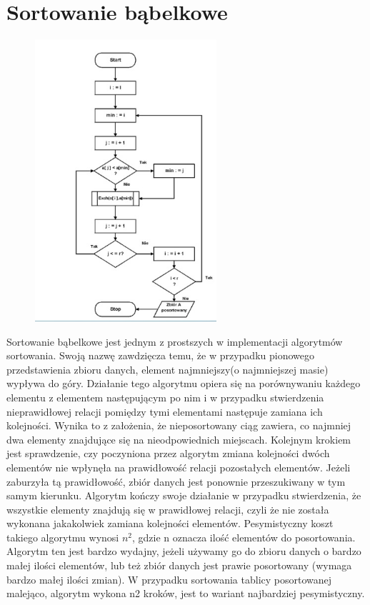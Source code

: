 \documentclass[a4paper,11pt]{article}
\begin{document}
\section{Sortowanie bąbelkowe}
\begin{figure}
\begin{center}
\vspace{-20pt}
\includegraphics[width=0.6\textwidth]{rys10}
\end{center}
\vspace{-20pt}
\vspace{-10pt}
\end{figure}
Sortowanie bąbelkowe jest jednym z prostszych w 
implementacji algorytmów sortowania. Swoją nazwę 
zawdzięcza temu, że w przypadku pionowego przedstawienia 
zbioru danych, element najmniejszy(o najmniejszej masie) 
wypływa do góry. Działanie tego algorytmu opiera się na 
porównywaniu każdego elementu z elementem 
następującym po nim i w przypadku stwierdzenia 
nieprawidłowej relacji pomiędzy tymi elementami następuje 
zamiana ich kolejności. 
Wynika to z założenia, że nieposortowany ciąg zawiera, co 
najmniej dwa elementy znajdujące się na nieodpowiednich 
miejscach. Kolejnym krokiem jest sprawdzenie, czy 
poczyniona przez algorytm zmiana kolejności dwóch 
elementów nie wpłynęła na prawidłowość relacji pozostałych 
elementów. Jeżeli zaburzyła tą prawidłowość, zbiór danych 
jest ponownie przeszukiwany w tym samym kierunku. 
Algorytm kończy swoje działanie w przypadku stwierdzenia, 
że wszystkie elementy znajdują się w prawidłowej relacji, czyli 
że nie została wykonana jakakolwiek zamiana kolejności 
elementów. Pesymistyczny koszt takiego algorytmu wynosi 
\begin{math}
n^{2}
\end{math}, gdzie n oznacza ilość elementów do posortowania. 
Algorytm ten jest bardzo wydajny, jeżeli używamy go do 
zbioru danych o bardzo małej ilości elementów, lub też zbiór 
danych jest prawie posortowany (wymaga bardzo małej ilości 
zmian). W przypadku sortowania tablicy posortowanej 
malejąco, algorytm wykona n2
 kroków, jest to wariant 
najbardziej pesymistyczny.
\newpage
\end{document}
